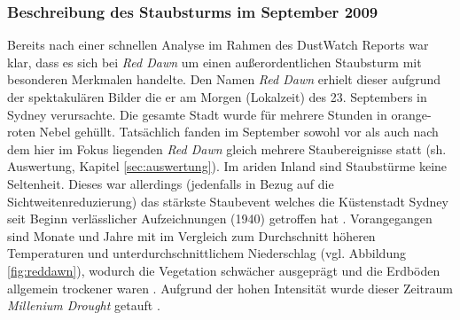 \documentclass[12pt,a4paper,onecolumn,headheight=30pt]{scrartcl}
\begin{document}
\subsubsection{Beschreibung des Staubsturms im September 2009} \label{sec:reddawn}
Bereits nach einer schnellen Analyse im Rahmen des DustWatch Reports \citep{Leys.2009} war klar, dass es sich bei \textit{Red Dawn} um einen außerordentlichen Staubsturm mit besonderen Merkmalen handelte. Den Namen \textit{Red Dawn} erhielt dieser aufgrund der spektakulären Bilder die er am Morgen (Lokalzeit) des 23. Septembers in Sydney verursachte. Die gesamte Stadt wurde für mehrere Stunden in orange-roten Nebel gehüllt. Tatsächlich fanden im September sowohl vor als auch nach dem hier im Fokus liegenden \textit{Red Dawn} gleich mehrere Staubereignisse statt (sh. Auswertung, Kapitel \ref{sec:auswertung}). Im ariden Inland sind Staubstürme keine Seltenheit. Dieses war allerdings (jedenfalls in Bezug auf die Sichtweitenreduzierung) das stärkste Staubevent welches die Küstenstadt Sydney seit Beginn verlässlicher Aufzeichnungen (1940) getroffen hat \citep{Leys.2011}. Vorangegangen sind Monate und Jahre mit im Vergleich zum Durchschnitt höheren Temperaturen und unterdurchschnittlichem Niederschlag (vgl. Abbildung \ref{fig:reddawn}), wodurch die Vegetation schwächer ausgeprägt und die Erdböden allgemein trockener waren \citep{Leys.2011}. Aufgrund der hohen Intensität wurde dieser Zeitraum \textit{Millenium Drought} getauft \citep{Deckker.2014}.
\end{document}
